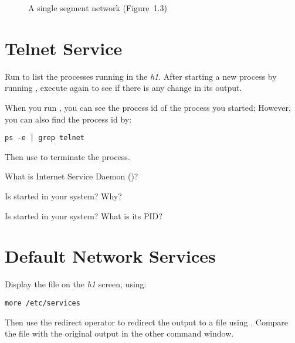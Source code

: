\documentclass{../UTNetLab}
\begin{document}
\begin{center}
\begin{minipage}{0.48\textwidth}
\begin{flushright}
\begin{figure}[H]
                \caption{A single segment network (Figure~1.3)}
            \end{figure}
        \end{flushright}
    \end{minipage}
\end{center}

\section{Telnet Service}
Run  to list the processes running in the \textit{h1}.
After starting a new process by running , execute  again to see if there is any change in its output.

When you run , you can see the process id of the  process you started;  However, you can also find the process id by:
\begin{lstlisting}
ps -e | grep telnet
    \end{lstlisting}
Then use  to terminate the  process.

\begin{report}
    \item What is Internet Service Daemon ()?

    \item Is  started in your system? Why?

    \item Is  started in your system? What is its PID?
\end{report}

\section{Default Network Services}
Display the file  on the \textit{h1} screen, using:
\begin{lstlisting}
more /etc/services
    \end{lstlisting}
Then use the redirect operator to redirect the  output to
a file using .
Compare the file  with the original  output in the other command window.
\end{document}
